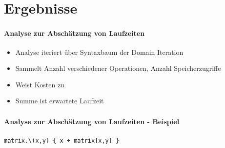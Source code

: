 \documentclass{beamer}
\begin{document}
\section{Ergebnisse}
\label{sect:results}

\begin{frame}
	\frametitle{}
	\framesubtitle{Analyse zur Abschätzung von Laufzeiten}
	\begin{itemize}
		\item Analyse iteriert über Syntaxbaum der Domain Iteration
		\item Sammelt Anzahl verschiedener Operationen, Anzahl Speicherzugriffe
		\item Weist Kosten zu
		\item Summe ist erwartete Laufzeit
	\end{itemize}
\end{frame}

\begin{frame}
	\frametitle{}
	\framesubtitle{Analyse zur Abschätzung von Laufzeiten - Beispiel}
	\begin{center}
		\texttt{matrix.\textbackslash(x,y) \{ x + matrix[x,y] \}}
	\end{center}
\end{frame}
\end{document}
